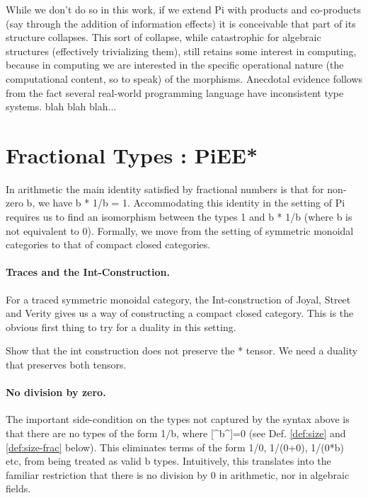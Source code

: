 \documentclass[preprint]{sigplanconf}
\begin{document}
While we don't do so in this work, if we extend {{Pi}} with products
and co-products (say through the addition of information effects) it
is conceivable that part of its structure collapses. This sort of
collapse, while catastrophic for algebraic structures (effectively
trivializing them), still retains some interest in computing, because
in computing we are interested in the specific operational nature (the
computational content, so to speak) of the morphisms. Anecdotal evidence
follows from the fact several real-world programming language have
inconsistent type systems. blah blah blah...

\section{Fractional Types : {{PiEE*}} }
\label{sec:int}


In arithmetic the main identity satisfied by fractional numbers is that for
non-zero {{b}}, we have {{b * 1/b = 1}}. Accommodating this identity in the
setting of {{Pi}} requires us to find an isomorphism between the types {{1}}
and {{b * 1/b}} (where {{b}} is not equivalent to {{0}}). Formally, we move
from the setting of symmetric monoidal categories to that of compact closed
categories.

%


\paragraph*{Traces and the Int-Construction.}
For a traced symmetric monoidal category, the Int-construction of
Joyal, Street and Verity \cite{joyal1996traced} gives us a way of
constructing a compact closed category. This is the obvious first
thing to try for a duality in this setting.



Show that the int construction does not preserve the {{*}} tensor. We
need a duality that preserves both tensors.

\paragraph*{No division by zero.} 
The important side-condition on the types not captured by the syntax
above is that there are no types of the form {{1/b}}, where
{{[^b^]=0}} (see Def. \ref{def:size} and \ref{def:size-frac}
below). This eliminates terms of the form {{1/0}}, {{1/(0+0)}},
{{1/(0*b)}} etc, from being treated as valid {{b}} types. Intuitively,
this translates into the familiar restriction that there is no
division by 0 in arithmetic, nor in algebraic fields.
\end{document}
